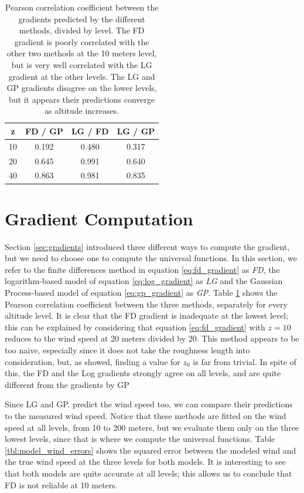 \documentclass[a4paper,11pt]{kth-mag}
\begin{document}
\begin{table}[]
\centering
\caption{Pearson correlation coefficient between the gradients predicted by the different methods, divided by level. The FD gradient is poorly correlated with the other two methods at the 10 meters level, but is very well correlated with the LG gradient at the other levels. The LG and GP gradients disagree on the lower levels, but it appears their predictions converge as altitude increases.}
\label{tbl:gradients_corr}
\begin{tabular}{c|c|c|c}
\toprule
\textbf{z} & \textbf{FD / GP} & \textbf{LG / FD} & \textbf{LG / GP} \\ \midrule
 	10 & 	0.192 & 0.480 &	0.317 \\
 	20 &	0.645 	& 0.991 &	0.640 \\
 	40 &	0.863 & 0.981 &	0.835 \\
\bottomrule
\end{tabular}
\end{table}


\section{Gradient Computation}
\label{sec:res_gradient}
Section \ref{sec:gradients} introduced three different ways to compute the gradient, but we need to choose one to compute the universal functions. In this section, we refer to the finite differences method in equation \ref{eq:fd_gradient} as \emph{FD}, the logarithm-based model of equation \ref{eq:log_gradient} as \emph{LG} and the Gaussian Process-based model of equation \ref{eq:gp_gradient} as \emph{GP}. Table \ref{tbl:gradients_corr} shows the Pearson correlation coefficient between the three methods, separately for every altitude level. It is clear that the FD gradient is inadequate at the lowest level; this can be explained by considering that equation \ref{eq:fd_gradient} with $z=10$ reduces to the wind speed at 20 meters divided by 20. This method appears to be too naive, especially since it does not take the roughness length into consideration, but, as \cite{cabauw_z0} showed, finding a value for $z_0$ is far from trivial. In spite of this, the FD and the Log gradients strongly agree on all levels, and are quite different from the gradients by GP

Since LG and GP. predict the wind speed too, we can compare their predictions to the measured wind speed. Notice that these methods are fitted on the wind speed at all levels, from 10 to 200 meters, but we evaluate them only on the three lowest levels, since that is where we compute the universal functions. Table \ref{tbl:model_wind_errors} shows the squared error between the modeled wind and the true wind speed at the three levels for both models. It is interesting to see that both models are quite accurate at all levels; this allows us to conclude that FD is not reliable at 10 meters.
\end{document}
